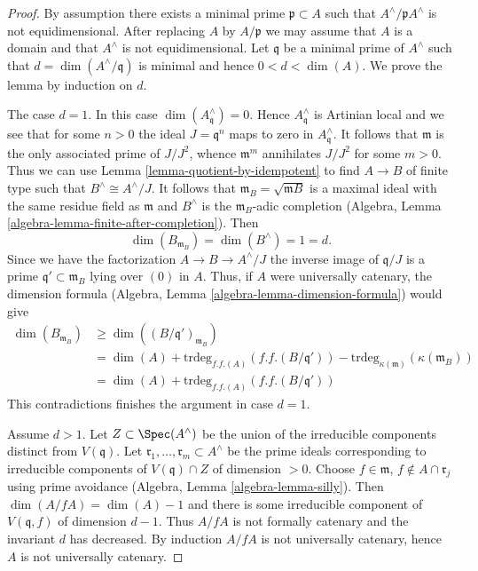 \begin{proof}
By assumption there exists a minimal prime $\mathfrak p \subset A$
such that $A^\wedge /\mathfrak p A^\wedge$ is not equidimensional.
After replacing $A$ by $A/\mathfrak p$ we may assume that $A$
is a domain and that $A^\wedge$ is not equidimensional.
Let $\mathfrak q$ be a minimal prime of
$A^\wedge$ such that $d = \dim(A^\wedge/\mathfrak q)$
is minimal and hence $0 < d < \dim(A)$. We prove the lemma by induction
on $d$.

\medskip\noindent
The case $d = 1$. In this case $\dim(A^\wedge_\mathfrak q) = 0$.
Hence $A^\wedge_\mathfrak q$ is Artinian local and we see that
for some $n > 0$ the ideal $J = \mathfrak q^n$ maps to zero in
$A^\wedge_\mathfrak q$. It follows that $\mathfrak m$ is the
only associated prime of $J/J^2$, whence $\mathfrak m^m$ annihilates
$J/J^2$ for some $m > 0$. Thus we can use
Lemma \ref{lemma-quotient-by-idempotent}
to find $A \to B$ of finite type such that $B^\wedge \cong A^\wedge/J$.
It follows that $\mathfrak m_B = \sqrt{\mathfrak mB}$ is a maximal
ideal with the same residue field as $\mathfrak m$ and $B^\wedge$
is the $\mathfrak m_B$-adic completion
(Algebra, Lemma \ref{algebra-lemma-finite-after-completion}).
Then
$$
\dim(B_{\mathfrak m_B}) = \dim(B^\wedge) = 1 = d.
$$
Since we have the factorization $A \to B \to A^\wedge/J$ the inverse image
of $\mathfrak q/J$ is a prime $\mathfrak q' \subset \mathfrak m_B$ lying
over $(0)$ in $A$. Thus, if $A$ were universally catenary, the dimension
formula (Algebra, Lemma \ref{algebra-lemma-dimension-formula}) would give
\begin{align*}
\dim(B_{\mathfrak m_B})
& \geq
\dim((B/\mathfrak q')_{\mathfrak m_B}) \\
& =
\dim(A) + \text{trdeg}_{f.f.(A)}(f.f.(B/\mathfrak q')) -
\text{trdeg}_{\kappa(\mathfrak m)}(\kappa(\mathfrak m_B)) \\
& =
\dim(A) + \text{trdeg}_{f.f.(A)}(f.f.(B/\mathfrak q'))
\end{align*}
This contradictions finishes the argument in case $d = 1$.

\medskip\noindent
Assume $d > 1$. Let $Z \subset \Spec(A^\wedge)$ be the union of
the irreducible components distinct from $V(\mathfrak q)$.
Let $\mathfrak r_1, \ldots, \mathfrak r_m \subset A^\wedge$
be the prime ideals corresponding to irreducible components of
$V(\mathfrak q) \cap Z$ of dimension $> 0$.
Choose $f \in \mathfrak m$, $f \not \in A \cap \mathfrak r_j$
using prime avoidance (Algebra, Lemma \ref{algebra-lemma-silly}).
Then $\dim(A/fA) = \dim(A) - 1$ and there is some irreducible
component of $V(\mathfrak q, f)$ of dimension $d - 1$.
Thus $A/fA$ is not formally catenary and the invariant $d$ has
decreased. By induction $A/fA$ is not universally catenary, hence
$A$ is not universally catenary.
\end{proof}

